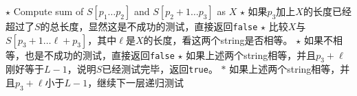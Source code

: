 \begin{algorithm}[H]
\begin{algorithmic}[1]
\State $\star$ Compute sum of $S[p_1\ldots p_2]$ and $S[p_2+1\ldots p_3]$ as $X$
\State $\star$ 如果$p_3$加上$X$的长度已经超过了$S$的总长度，显然这是不成功的测试，直接返回\texttt{false}
\State $\star$ 比较$X$与$S[p_3+1\ldots\ell+p_3]$，其中$\ell$是$X$的长度，看这两个string是否相等。
\State $\star$ 如果不相等，也是不成功的测试，直接返回\texttt{false}
\State $\star$ 如果上述两个string相等，并且$p_3+\ell$刚好等于$L-1$，说明$S$已经测试完毕，返回\texttt{true}。
\State $\ast$ 如果上述两个string相等，并且$p_3+\ell$小于$L-1$，继续下一层递归测试
\State \Return {}
\EndProcedure
\end{algorithmic}
\end{algorithm}
\setcounter{lstlisting}{0}
